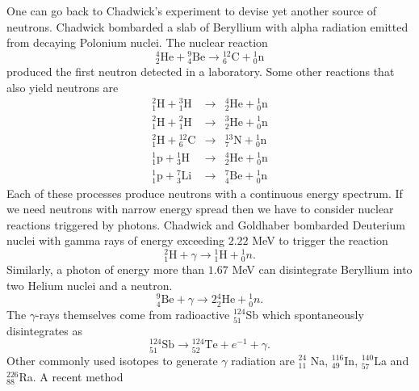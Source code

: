 \documentclass{article}
\numberwithin{equation}{section}
\begin{document}
One can go back to
Chadwick's experiment \cite{chadwick1932existence} to devise yet another source
of neutrons. Chadwick bombarded a slab of Beryllium with alpha radiation 
emitted from decaying Polonium nuclei. The nuclear reaction
\begin{equation}\label{s3e1}
{}_2^4\text{He} + {}_4^9\text{Be} \rightarrow {}_6^{12}\text{C}+{}_0^1\text{n}
\end{equation}
produced the first neutron detected in a laboratory. Some other reactions that 
also yield neutrons are\cite{turner2008atoms}
\begin{eqnarray}
{}^2_1\text{H} + {}^3_1\text{H}&\rightarrow&{}_2^{4}\text{He}+{}_0^1\text{n}
\label{s3e2} \\
{}^2_1\text{H} + {}^2_1\text{H}&\rightarrow&{}_2^{3}\text{He}+{}_0^1\text{n}
\label{s3e3} \\
{}^2_1\text{H} + {}_6^{12}\text{C}&\rightarrow&{}_7^{13}\text{N}+{}_0^1\text{n}
\label{s3e4} \\
{}^1_1\text{p} + {}_3^1\text{H}&\rightarrow&{}_2^{4}\text{He}+{}_0^1\text{n}
\label{s3e5} \\
{}_1^1\text{p} + {}_3^7\text{Li}&\rightarrow&{}_4^{7}\text{Be}+{}_0^1\text{n}
 \label{s3e6} 
\end{eqnarray}
Each of these processes produce neutrons with a continuous energy spectrum. If
we need neutrons with narrow energy spread then we have to consider nuclear
reactions triggered by photons. Chadwick and Goldhaber 
\cite{chadwick1934nuclear} bombarded Deuterium nuclei with gamma rays of energy
exceeding $2.22$ MeV to trigger the reaction
\begin{equation}\label{s3e7}
{}^2_1\text{H} + \gamma \rightarrow {}^1_1 \text{H} + {}^1_0 n.
\end{equation}
Similarly, a photon of energy more than $1.67$ MeV can disintegrate Beryllium
into two Helium nuclei and a neutron.
\begin{equation}\label{s3e8}
{}^9_4\text{Be} + \gamma \rightarrow 2 {}^4_2\text{He} + {}^1_0 n.
\end{equation}
The $\gamma$-rays themselves come from radioactive ${}^{124}_{51}$Sb which 
spontaneously disintegrates as
\begin{equation}\label{s3e9}
{}^{124}_{51}\text{Sb} \rightarrow {}^{124}_{52}\text{Te} + e^{-1} + \gamma.
\end{equation}
Other commonly used isotopes to generate $\gamma$ radiation are ${}^{24}_{11}$
Na, ${}^{116}_{49}$In, ${}^{140}_{57}$La and ${}^{226}_{88}$Ra. A recent method
\end{document}
